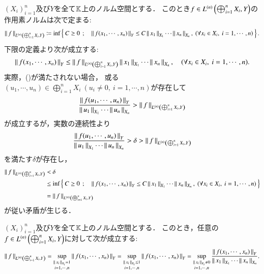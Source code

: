 	$(X_i)_{i=1}^n$及び$Y$を全て$\K$上のノルム空間とする．
	このとき$f \in \ContLn{\bigoplus_{i=1}^n X_i}{Y}{n}$の作用素ノルムは次で定まる:
	\begin{align}
		\Norm{f}{\ContLn{\bigoplus_{i=1}^n X_i}{Y}{n}}
		\coloneqq \inf{}{\Set{C \geq 0}{\Norm{f(x_1,\cdots,x_n)}{Y} \leq C \Norm{x_1}{X_1}\cdots\Norm{x_n}{X_n},\ (\forall x_i \in X_i,\ i=1,\cdots,n)}}.
	\end{align}
	下限の定義より次が成立する:
	\begin{align}
		\Norm{f(x_1,\cdots,x_n)}{Y} \leq \Norm{f}{\ContLn{\bigoplus_{i=1}^n X_i}{Y}{n}} 
		\Norm{x_1}{X_1}\cdots\Norm{x_n}{X_n},
		\quad (\forall x_i \in X_i,\ i=1,\cdots,n).
		\label{eq:operator_norm_of_multilinear_mapping}
	\end{align}
	実際，()が満たされない場合，
	或る$(u_1,\cdots,u_n) \in \bigoplus_{i=1}^n X_i\
	 (u_i \neq 0,\ i=1,\cdots,n)$が存在して
	\begin{align}
		\frac{\Norm{f(u_1,\cdots,u_n)}{Y}}{\Norm{u_1}{X_1}\cdots\Norm{u_n}{X_n}} 
		> \Norm{f}{\ContLn{\bigoplus_{i=1}^n X_i}{Y}{n}}
	\end{align}
	が成立するが，実数の連続性より
	\begin{align}
		\frac{\Norm{f(u_1,\cdots,u_n)}{Y}}{\Norm{u_1}{X_1}\cdots\Norm{u_n}{X_n}} 
		> \delta > \Norm{f}{\ContLn{\bigoplus_{i=1}^n X_i}{Y}{n}}
	\end{align}
	を満たす$\delta$が存在し，
	\begin{align}
		\Norm{f}{\ContLn{\bigoplus_{i=1}^n X_i}{Y}{n}} 
		&< \delta \\
		&\leq \inf{}{\Set{C \geq 0}{\Norm{f(x_1,\cdots,x_n)}{Y} \leq C \Norm{x_1}{X_1}\cdots\Norm{x_n}{X_n},\ (\forall x_i \in X_i,\ i=1,\cdots,n)}} \\
		&= \Norm{f}{\ContLn{\bigoplus_{i=1}^n X_i}{Y}{n}}
	\end{align}
	が従い矛盾が生じる．
	
	\begin{screen}
		\begin{thm}[多重線型写像の作用素ノルム]
			$(X_i)_{i=1}^n$及び$Y$を全て$\K$上のノルム空間とする．
			このとき，任意の$f \in \ContLn{\bigoplus_{i=1}^n X_i}{Y}{n}$に対して次が成立する:
			\begin{align}
				\Norm{f}{\ContLn{\bigoplus_{i=1}^n X_i}{Y}{n}}
				= \sup{\substack{\Norm{x_i}{X_i} = 1 \\ i=1,\cdots,n}}{\Norm{f(x_1,\cdots,x_n)}{Y}}
				= \sup{\substack{\Norm{x_i}{X_i} \leq 1 \\ i=1,\cdots,n}}{\Norm{f(x_1,\cdots,x_n)}{Y}}
				= \sup{\substack{\Norm{x_i}{X_i} \neq 0 \\ i=1,\cdots,n}}{
					\frac{\Norm{f(x_1,\cdots,x_n)}{Y}}{\Norm{x_1}{X_1} \cdots \Norm{x_n}{X_n}}}.
			\end{align}
		\end{thm}
	\end{screen}
	
